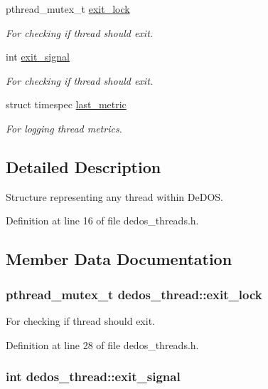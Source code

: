 \begin{DoxyCompactItemize}
pthread\-\_\-mutex\-\_\-t \hyperlink{structdedos__thread_abff71615fe6947f8fed5a26e198b6b4b}{exit\-\_\-lock}
\begin{DoxyCompactList}\small\item\em For checking if thread should exit. \end{DoxyCompactList}\item 
int \hyperlink{structdedos__thread_ae1ad6c5ad2f9c080a1b396a8572e75f5}{exit\-\_\-signal}
\begin{DoxyCompactList}\small\item\em For checking if thread should exit. \end{DoxyCompactList}\item 
struct timespec \hyperlink{structdedos__thread_aa45d04173d89640ec2ddeb95c66db84e}{last\-\_\-metric}
\begin{DoxyCompactList}\small\item\em For logging thread metrics. \end{DoxyCompactList}\end{DoxyCompactItemize}


\subsection{Detailed Description}
Structure representing any thread within De\-D\-O\-S. 

Definition at line 16 of file dedos\-\_\-threads.\-h.



\subsection{Member Data Documentation}
\hypertarget{structdedos__thread_abff71615fe6947f8fed5a26e198b6b4b}{
\subsubsection[{exit\-\_\-lock}]{\setlength{\rightskip}{0pt plus 5cm}pthread\-\_\-mutex\-\_\-t dedos\-\_\-thread\-::exit\-\_\-lock}}\label{structdedos__thread_abff71615fe6947f8fed5a26e198b6b4b}


For checking if thread should exit. 



Definition at line 28 of file dedos\-\_\-threads.\-h.

\hypertarget{structdedos__thread_ae1ad6c5ad2f9c080a1b396a8572e75f5}{
\subsubsection[{exit\-\_\-signal}]{\setlength{\rightskip}{0pt plus 5cm}int dedos\-\_\-thread\-::exit\-\_\-signal}}\label{structdedos__thread_ae1ad6c5ad2f9c080a1b396a8572e75f5}


